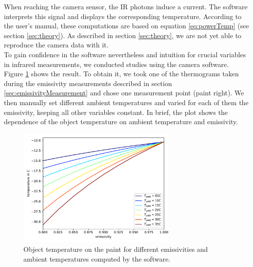 When reaching the camera sensor, the IR photons induce a current. The software interprets this signal and displays the corresponding temperature. According to the user's manual, these computations are based on equation \eqref{eq:powerTemp} (see section \ref{sec:theory}). As described in section \ref{sec:theory}, we are not yet able to reproduce the camera data with it. \\


To gain confidence in the software nevertheless and intuition for crucial variables in infrared measurements, we conducted studies using the camera software. Figure \ref{fig:softwareClean} shows the result. To obtain it, we took one of the thermograms taken during the emissivity measurements described in section \ref{sec:emissivityMeasurement} and chose one measurement point (paint right). We then manually set different ambient temperatures and varied for each of them the emissivity, keeping all other variables constant. In brief, the plot shows the dependence of the object temperature on ambient temperature and emissivity.
\begin{figure}[h!]
	\centering
	\includegraphics[width=0.7\textwidth]{img/softwareClean.pdf}
	\caption{Object temperature on the paint for different emissivities and ambient temperatures computed by the software.}
	\label{fig:softwareClean}
\end{figure}


